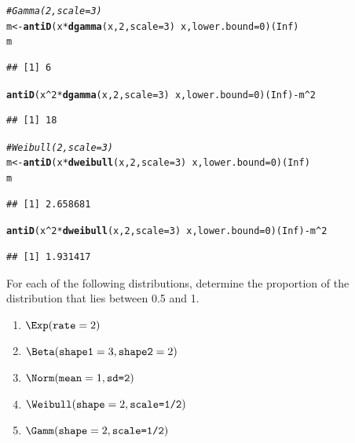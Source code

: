 \documentclass[twoside]{book}\usepackage[]{graphicx}\usepackage[]{xcolor}
\makeatletter
\newcommand{\hlnum}[1]{\textcolor[rgb]{0.686,0.059,0.569}{#1}}%
\newcommand{\hlcom}[1]{\textcolor[rgb]{0.678,0.584,0.686}{\textit{#1}}}%
\newcommand{\hlopt}[1]{\textcolor[rgb]{0,0,0}{#1}}%
\newcommand{\hlstd}[1]{\textcolor[rgb]{0.345,0.345,0.345}{#1}}%
\newcommand{\hlkwb}[1]{\textcolor[rgb]{0.69,0.353,0.396}{#1}}%
\newcommand{\hlkwc}[1]{\textcolor[rgb]{0.333,0.667,0.333}{#1}}%
\newcommand{\hlkwd}[1]{\textcolor[rgb]{0.737,0.353,0.396}{\textbf{#1}}}%
\newenvironment{kframe}{%
 \def\at@end@of@kframe{}%
 \ifinner\ifhmode%
  \def\at@end@of@kframe{\end{minipage}}%
  \begin{minipage}{\columnwidth}%
 \fi\fi%
 \def\FrameCommand##1{\hskip\@totalleftmargin \hskip-\fboxsep
 \colorbox{shadecolor}{##1}\hskip-\fboxsep
     \hskip-\linewidth \hskip-\@totalleftmargin \hskip\columnwidth}%
 \MakeFramed {\advance\hsize-\width
   \@totalleftmargin\z@ \linewidth\hsize
   \@setminipage}}%
 {\par\unskip\endMakeFramed%
 \at@end@of@kframe}
\newenvironment{knitrout}{}{} %
\makeatother
\begin{document}
\begin{solution}
\begin{knitrout}
\begin{kframe}
\begin{alltt}
\hlcom{# Gamma(2,scale=3)}
\hlstd{m} \hlkwb{<-} \hlkwd{antiD}\hlstd{( x} \hlopt{*} \hlkwd{dgamma}\hlstd{(x,}\hlnum{2}\hlstd{,}\hlkwc{scale}\hlstd{=}\hlnum{3}\hlstd{)} \hlopt{~} \hlstd{x,} \hlkwc{lower.bound}\hlstd{=}\hlnum{0}\hlstd{)(}\hlnum{Inf}\hlstd{)}
\hlstd{m}
\end{alltt}
\begin{verbatim}
## [1] 6
\end{verbatim}
\begin{alltt}
\hlkwd{antiD}\hlstd{( x}\hlopt{^}\hlnum{2} \hlopt{*} \hlkwd{dgamma}\hlstd{(x,}\hlnum{2}\hlstd{,}\hlkwc{scale}\hlstd{=}\hlnum{3}\hlstd{)} \hlopt{~} \hlstd{x,} \hlkwc{lower.bound}\hlstd{=}\hlnum{0} \hlstd{)(}\hlnum{Inf}\hlstd{)} \hlopt{-} \hlstd{m}\hlopt{^}\hlnum{2}
\end{alltt}
\begin{verbatim}
## [1] 18
\end{verbatim}
\end{kframe}
\end{knitrout}
\begin{knitrout}
\color{fgcolor}\begin{kframe}
\begin{alltt}
\hlcom{# Weibull(2,scale=3)}
\hlstd{m} \hlkwb{<-} \hlkwd{antiD}\hlstd{( x} \hlopt{*} \hlkwd{dweibull}\hlstd{(x,}\hlnum{2}\hlstd{,}\hlkwc{scale}\hlstd{=}\hlnum{3}\hlstd{)} \hlopt{~} \hlstd{x,} \hlkwc{lower.bound}\hlstd{=}\hlnum{0}\hlstd{)(}\hlnum{Inf}\hlstd{)}
\hlstd{m}
\end{alltt}
\begin{verbatim}
## [1] 2.658681
\end{verbatim}
\begin{alltt}
\hlkwd{antiD}\hlstd{( x}\hlopt{^}\hlnum{2} \hlopt{*} \hlkwd{dweibull}\hlstd{(x,}\hlnum{2}\hlstd{,}\hlkwc{scale}\hlstd{=}\hlnum{3}\hlstd{)} \hlopt{~} \hlstd{x,} \hlkwc{lower.bound}\hlstd{=}\hlnum{0} \hlstd{)(}\hlnum{Inf}\hlstd{)} \hlopt{-} \hlstd{m}\hlopt{^}\hlnum{2}
\end{alltt}
\begin{verbatim}
## [1] 1.931417
\end{verbatim}
\end{kframe}
\end{knitrout}
\end{solution}


\begin{problem}
	For each of the following distributions, determine the proportion 
	of the distribution that lies between 0.5 and 1.
	\begin{enumerate}
		\item
			$\Exp(\texttt{rate} = 2)$
		\item
			$\Beta(\texttt{shape1} = 3, \texttt{shape2}=2)$
		\item
			$\Norm(\texttt{mean} = 1, \texttt{sd=2})$
		\item
			$\Weibull(\texttt{shape} = 2, \texttt{scale=1/2})$
		\item
			$\Gamm(\texttt{shape} = 2, \texttt{scale=1/2})$
	\end{enumerate}
\end{problem}
\end{document}
